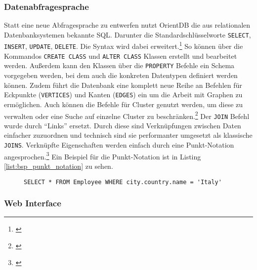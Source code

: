 \subsubsection{Datenabfragesprache}


Statt eine neue Abfragesprache zu entwerfen nutzt OrientDB die aus relationalen Datenbanksystemen bekannte \gls{SQL}. Darunter die Standardschlüsselworte \texttt{SELECT}, \texttt{INSERT}, \texttt{UPDATE}, \texttt{DELETE}. Die Syntax wird dabei erweitert.\footnote{\cite[Vgl.][]{OrientDBSQL}} So können über die Kommandos \texttt{CREATE CLASS} und \texttt{ALTER CLASS} Klassen erstellt und bearbeitet werden. Außerdem kann den Klassen über die \texttt{PROPERTY} Befehle ein Schema vorgegeben werden, bei dem auch die konkreten Datentypen definiert werden können. Zudem führt die Datenbank eine komplett neue Reihe an Befehlen für Eckpunkte (\texttt{VERTICES}) und Kanten (\texttt{EDGES}) ein um die Arbeit mit Graphen zu ermöglichen. Auch können die Befehle für Cluster genutzt werden, um diese zu verwalten oder eine Suche auf einzelne Cluster zu beschränken.\footnote{\cite[Vgl.][]{OrientDBCommands}} Der \texttt{JOIN} Befehl wurde durch \enquote{Links} ersetzt. Durch diese sind Verknüpfungen zwischen Daten einfacher zuzuordnen und technisch sind sie performanter umgesetzt als klassische \texttt{JOINS}. Verknüpfte Eigenschaften werden einfach durch eine Punkt-Notation angesprochen.\footnote{\cite[Vgl.][]{OrientDBSQL}} Ein Beispiel für die Punkt-Notation ist in Listing \ref{list:bsp_punkt_notation} zu sehen.

\begin{figure}[!htb]
    \begin{lstlisting}[caption=Beispiel der Punkt-Notation mit OrientDB Links, label=list:bsp_punkt_notation]
SELECT * FROM Employee WHERE city.country.name = 'Italy'
    \end{lstlisting}
\end{figure}


\subsubsection{Web Interface}

